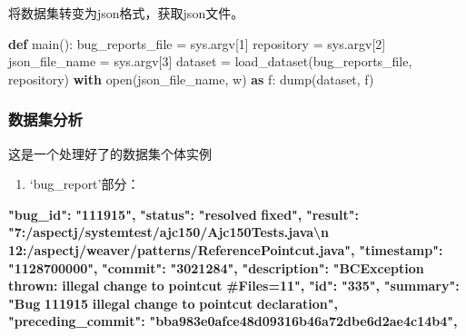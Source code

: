 \documentclass[
]{article}
\newenvironment{Shaded}{}{}
\newcommand{\BuiltInTok}[1]{\textcolor[rgb]{0.00,0.50,0.00}{#1}}
\newcommand{\ControlFlowTok}[1]{\textcolor[rgb]{0.00,0.44,0.13}{\textbf{#1}}}
\newcommand{\DecValTok}[1]{\textcolor[rgb]{0.25,0.63,0.44}{#1}}
\newcommand{\ErrorTok}[1]{\textcolor[rgb]{1.00,0.00,0.00}{\textbf{#1}}}
\newcommand{\ImportTok}[1]{\textcolor[rgb]{0.00,0.50,0.00}{\textbf{#1}}}
\newcommand{\KeywordTok}[1]{\textcolor[rgb]{0.00,0.44,0.13}{\textbf{#1}}}
\newcommand{\NormalTok}[1]{#1}
\newcommand{\OperatorTok}[1]{\textcolor[rgb]{0.40,0.40,0.40}{#1}}
\newcommand{\StringTok}[1]{\textcolor[rgb]{0.25,0.44,0.63}{#1}}
\begin{document}
将数据集转变为json格式，获取json文件。

\begin{Shaded}
  \begin{Highlighting}[]
    \KeywordTok{def}\NormalTok{ main():}
    \NormalTok{    bug\_reports\_file }\OperatorTok{=}\NormalTok{ sys.argv[}\DecValTok{1}\NormalTok{]}
    \NormalTok{    repository }\OperatorTok{=}\NormalTok{ sys.argv[}\DecValTok{2}\NormalTok{]}
    \NormalTok{    json\_file\_name }\OperatorTok{=}\NormalTok{ sys.argv[}\DecValTok{3}\NormalTok{]}
    \NormalTok{    dataset }\OperatorTok{=}\NormalTok{ load\_dataset(bug\_reports\_file, repository)}
    \ControlFlowTok{with} \BuiltInTok{open}\NormalTok{(json\_file\_name, }\StringTok{\textquotesingle{}w\textquotesingle{}}\NormalTok{) }\ImportTok{as}\NormalTok{ f:}
    \NormalTok{        dump(dataset, f)}
  \end{Highlighting}
\end{Shaded}

\subsubsection{数据集分析}\label{ux6570ux636eux96c6ux5206ux6790}

这是一个处理好了的数据集个体实例

\begin{enumerate}
  \def\labelenumi{\arabic{enumi}.}
  \item
        `bug\_report'部分：
\end{enumerate}

\begin{Shaded}
  \begin{Highlighting}[]
    \ErrorTok{"bug\_id":} \ErrorTok{"111915",}
    \ErrorTok{"status":} \ErrorTok{"resolved} \ErrorTok{fixed",}
    \ErrorTok{"result":} \ErrorTok{"7:/aspectj/systemtest/ajc150/Ajc150Tests.java\textbackslash{}n} \ErrorTok{12:/aspectj/weaver/patterns/ReferencePointcut.java",}
    \ErrorTok{"timestamp":} \ErrorTok{"1128700000",}
    \ErrorTok{"commit":} \ErrorTok{"3021284",}
    \ErrorTok{"description":} \ErrorTok{"BCException} \ErrorTok{thrown:} \ErrorTok{illegal} \ErrorTok{change} \ErrorTok{to} \ErrorTok{pointcut} \ErrorTok{\#Files=11",}
    \ErrorTok{"id":} \ErrorTok{"335",}
    \ErrorTok{"summary":} \ErrorTok{"Bug} \ErrorTok{111915}  \ErrorTok{illegal} \ErrorTok{change} \ErrorTok{to} \ErrorTok{pointcut} \ErrorTok{declaration",}
    \ErrorTok{"preceding\_commit":} \ErrorTok{"bba983e0afce48d09316b46a72dbe6d2ae4c14b4",}
  \end{Highlighting}
\end{Shaded}
\end{document}
